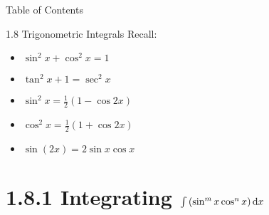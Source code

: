 

 \begin{frame}{Table of Contents }
\mapofcontentsA{\ah,\atech}
 \end{frame}

\begin{frame}{1.8 Trigonometric Integrals}
Recall:
\begin{itemize}
\item $\sin^2  x + \cos^2 x = 1$
\item $\tan^2x+1=\sec^2x$
\item $\sin^2 x = \frac{1}{2}(1-\cos 2x)$
\item $\cos^2 x = \frac{1}{2}(1+\cos 2x)$
\item $\sin(2x)=2\sin x \cos x$
\end{itemize}\vfill
{}
\label{note1.8a}
\end{frame}
\section{1.8.1 Integrating $\int\left(\sin^mx\cos^nx\right)\text{d} x$}

